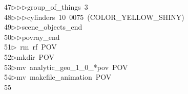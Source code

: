 \begin{tabbing}
47\>$\triangleright$\>$\triangleright$\>$\triangleright$\>group\_of\_things\ 3\ \\[0pt]
48\>$\triangleright$\>$\triangleright$\>$\triangleright$\>cylinders\ 10\ 0075\ (COLOR\_YELLOW\_SHINY)\ \\[0pt]
49\>$\triangleright$\>$\triangleright$\>scene\_objects\_end\ \\[0pt]
50\>$\triangleright$\>$\triangleright$\>povray\_end\\[0pt]
51\>$\triangleright$\>\ rm\ rf\ POV\\[0pt]
52\>$\triangleright$\>mkdir\ POV\\[0pt]
53\>$\triangleright$\>mv\ analytic\_geo\_1\_0\_*pov\ POV\\[0pt]
54\>$\triangleright$\>mv\ makefile\_animation\ POV\\[0pt]
55\>\end{tabbing}
